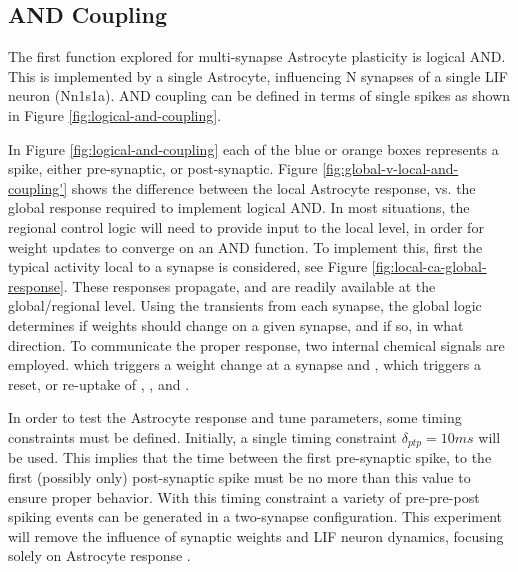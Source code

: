 
\subsection{AND Coupling}
The first function explored for multi-synapse Astrocyte plasticity is logical
AND. This is implemented by a single Astrocyte, influencing N synapses of a
single LIF neuron (Nn1s1a). AND coupling can be defined in terms of single
spikes as shown in Figure \ref{fig:logical-and-coupling}.


In Figure \ref{fig:logical-and-coupling} each of the blue or orange boxes
represents a spike, either pre-synaptic, or post-synaptic. Figure
\ref{fig:global-v-local-and-coupling'} shows the difference between the local
Astrocyte response, vs. the global response required to implement logical
AND. In most situations, the regional control logic will need to provide input
to the local level, in order for weight updates to converge on an AND
function. To implement this, first the typical activity local to a
synapse is considered, see Figure \ref{fig:local-ca-global-response}. These \ca
responses propagate, and are readily available at the global/regional
level. Using the \ca transients from each synapse, the global logic determines
if weights should change on a given synapse, and if so, in what direction. To
communicate the proper response, two internal chemical signals are
employed. \dser which triggers a weight change at a synapse and \serca, which
triggers a reset, or re-uptake of \ca, \ipt, and \kp.



In order to test the Astrocyte response and tune parameters, some timing
constraints must be defined. Initially, a single timing constraint
$\delta_{ptp}=10ms$ will be used. This implies that the time between the
first pre-synaptic spike, to the first (possibly only) post-synaptic spike must
be no more than this value to ensure proper behavior. With this timing
constraint a variety of pre-pre-post spiking events can be generated in a
two-synapse configuration. This experiment will remove the influence of synaptic
weights and LIF neuron dynamics, focusing solely on Astrocyte response \ca.

